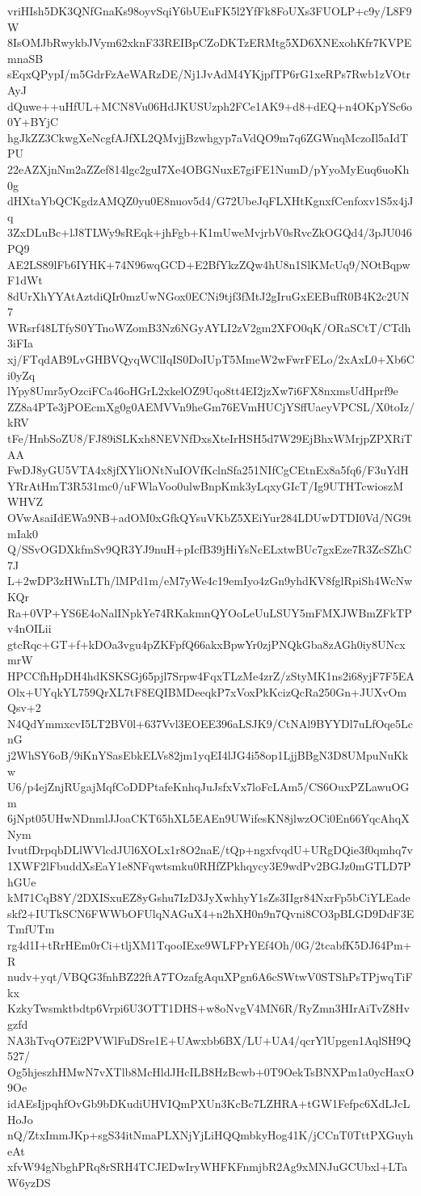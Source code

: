 vriHIsh5DK3QNfGnaKs98oyvSqiY6bUEuFK5l2YfFk8FoUXs3FUOLP+c9y/L8F9W
8IsOMJbRwykbJVym62xknF33REIBpCZoDKTzERMtg5XD6XNExohKfr7KVPEmnaSB
sEqxQPypI/m5GdrFzAeWARzDE/Nj1JvAdM4YKjpfTP6rG1xeRPs7Rwb1zVOtrAyJ
dQuwe++uHfUL+MCN8Vu06HdJKUSUzph2FCe1AK9+d8+dEQ+n4OKpYSc6o0Y+BYjC
hgJkZZ3CkwgXeNcgfAJfXL2QMvjjBzwhgyp7aVdQO9m7q6ZGWnqMczoIl5aIdTPU
22eAZXjnNm2aZZef814lgc2guI7Xe4OBGNuxE7giFE1NumD/pYyoMyEuq6uoKh0g
dHXtaYbQCKgdzAMQZ0yu0E8nuov5d4/G72UbeJqFLXHtKgnxfCenfoxv1S5x4jJq
3ZxDLuBc+lJ8TLWy9sREqk+jhFgb+K1mUweMvjrbV0sRvcZkOGQd4/3pJU046PQ9
AE2LS89lFb6IYHK+74N96wqGCD+E2BfYkzZQw4hU8n1SlKMcUq9/NOtBqpwF1dWt
8dUrXhYYAtAztdiQIr0mzUwNGox0ECNi9tjf3fMtJ2gIruGxEEBufR0B4K2c2UN7
WRsrf48LTfyS0YTnoWZomB3Nz6NGyAYLI2zV2gm2XFO0qK/ORaSCtT/CTdh3iFIa
xj/FTqdAB9LvGHBVQyqWClIqIS0DoIUpT5MmeW2wFwrFELo/2xAxL0+Xb6Ci0yZq
lYpy8Umr5yOzciFCa46oHGrL2xkelOZ9Uqo8tt4EI2jzXw7i6FX8nxmsUdHprf9e
ZZ8a4PTe3jPOEcmXg0g0AEMVVn9heGm76EVmHUCjYSffUaeyVPCSL/X0toIz/kRV
tFe/HnbSoZU8/FJ89iSLKxh8NEVNfDxsXteIrHSH5d7W29EjBhxWMrjpZPXRiTAA
FwDJ8yGU5VTA4x8jfXYliONtNuIOVfKclnSfa251NIfCgCEtnEx8a5fq6/F3uYdH
YRrAtHmT3R531mc0/uFWlaVoo0ulwBnpKmk3yLqxyGIcT/Ig9UTHTcwioszMWHVZ
OVwAsaiIdEWa9NB+adOM0xGfkQYsuVKbZ5XEiYur284LDUwDTDI0Vd/NG9tmIak0
Q/SSvOGDXkfmSv9QR3YJ9nuH+pIcfB39jHiYsNcELxtwBUc7gxEze7R3ZcSZhC7J
L+2wDP3zHWnLTh/lMPd1m/eM7yWe4c19emIyo4zGn9yhdKV8fglRpiSh4WcNwKQr
Ra+0VP+YS6E4oNalINpkYe74RKakmnQYOoLeUuLSUY5mFMXJWBmZFkTPv4nOILii
gtcRqc+GT+f+kDOa3vgu4pZKFpfQ66akxBpwYr0zjPNQkGba8zAGh0iy8UNcxmrW
HPCCfhHpDH4hdKSKSGj65pjl7Srpw4FqxTLzMe4zrZ/zStyMK1ns2i68yjF7F5EA
Olx+UYqkYL759QrXL7tF8EQIBMDeeqkP7xVoxPkKcizQcRa250Gn+JUXvOmQsv+2
N4QdYmmxcvI5LT2BV0l+637Vvl3EOEE396aLSJK9/CtNAl9BYYDl7uLfOqe5LcnG
j2WhSY6oB/9iKnYSasEbkELVs82jm1yqEI4lJG4i58op1LjjBBgN3D8UMpuNuKkw
U6/p4ejZnjRUgajMqfCoDDPtafeKnhqJuJsfxVx7loFcLAm5/CS6OuxPZLawuOGm
6jNpt05UHwNDnmlJJoaCKT65hXL5EAEn9UWifesKN8jlwzOCi0En66YqcAhqXNym
IvutfDrpqbDLlWVlcdJUl6XOLx1r8O2naE/tQp+ngxfvqdU+URgDQie3f0qmhq7v
1XWF2lFbuddXsEaY1e8NFqwtsmku0RHfZPkhqycy3E9wdPv2BGJz0mGTLD7PhGUe
kM71CqB8Y/2DXISxuEZ8yGshu7IzD3JyXwhhyY1sZs3IIgr84NxrFp5bCiYLEade
skf2+IUTkSCN6FWWbOFUlqNAGuX4+n2hXH0n9n7Qvni8CO3pBLGD9DdF3ETmfUTm
rg4d1I+tRrHEm0rCi+tljXM1TqooIExe9WLFPrYEf4Oh/0G/2tcabfK5DJ64Pm+R
nudv+yqt/VBQG3fnhBZ22ftA7TOzafgAquXPgn6A6cSWtwV0STShPsTPjwqTiFkx
KzkyTwsmktbdtp6Vrpi6U3OTT1DHS+w8oNvgV4MN6R/RyZmn3HIrAiTvZ8Hvgzfd
NA3hTvqO7Ei2PVWlFuDSre1E+UAwxbb6BX/LU+UA4/qcrYlUpgen1AqlSH9Q527/
Og5hjeszhHMwN7vXTlb8McHldJHcILB8HzBcwb+0T9OekTsBNXPm1a0ycHaxO9Oe
idAEsIjpqhfOvGb9bDKudiUHVIQmPXUn3KcBc7LZHRA+tGW1Fefpc6XdLJcLHoJo
nQ/ZtxImmJKp+sgS34itNmaPLXNjYjLiHQQmbkyHog41K/jCCnT0TttPXGuyheAt
xfvW94gNbghPRq8rSRH4TCJEDwIryWHFKFnmjbR2Ag9xMNJuGCUbxl+LTaW6yzDS
